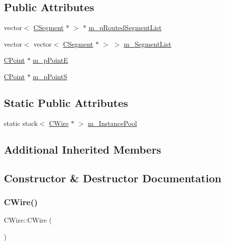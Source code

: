 \subsection*{Public Attributes}
\begin{DoxyCompactItemize}
\item 
vector$<$ \mbox{\hyperlink{classCSegment}{C\+Segment}} $\ast$ $>$ $\ast$ \mbox{\hyperlink{classCWire_aa9057c6d278c38fd01241ee802427243}{m\+\_\+p\+Routed\+Segment\+List}}
\item 
vector$<$ vector$<$ \mbox{\hyperlink{classCSegment}{C\+Segment}} $\ast$ $>$ $>$ \mbox{\hyperlink{classCWire_ab9e216e49ec590f52cc9a8b45cdf6445}{m\+\_\+\+Segment\+List}}
\item 
\mbox{\hyperlink{classCPoint}{C\+Point}} $\ast$ \mbox{\hyperlink{classCWire_a8d68a6a04afcb64c8447d17b8eb8a890}{m\+\_\+p\+PointE}}
\item 
\mbox{\hyperlink{classCPoint}{C\+Point}} $\ast$ \mbox{\hyperlink{classCWire_a1e90e0849093c7533aaa1b73deae66e2}{m\+\_\+p\+PointS}}
\end{DoxyCompactItemize}
\subsection*{Static Public Attributes}
\begin{DoxyCompactItemize}
\item 
static stack$<$ \mbox{\hyperlink{classCWire}{C\+Wire}} $\ast$ $>$ \mbox{\hyperlink{classCWire_ad95e3e57c6513cb487f4bbb6d0fceb60}{m\+\_\+\+Instance\+Pool}}
\end{DoxyCompactItemize}
\subsection*{Additional Inherited Members}


\subsection{Constructor \& Destructor Documentation}
\mbox{\label{classCWire_aaedab9ea265619eef584b208c675fdd3}} 
\subsubsection{\texorpdfstring{CWire()}{CWire()}}
{\footnotesize\ttfamily C\+Wire\+::\+C\+Wire (\begin{DoxyParamCaption}{ }\end{DoxyParamCaption})}

